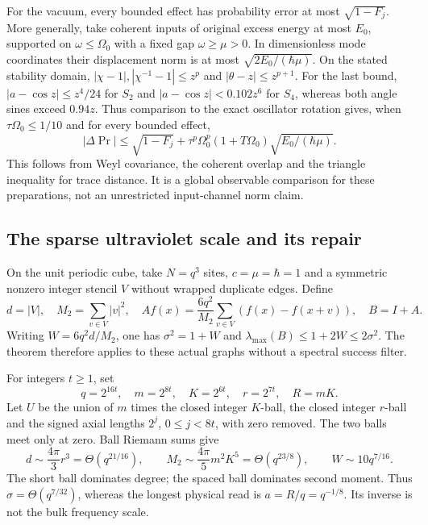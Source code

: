 For the vacuum, every bounded effect has probability error at most
$\sqrt{1-F_j}$. More generally, take coherent inputs of original excess
energy at most $E_0$, supported on $\omega\le\Omega_0$ with a fixed gap
$\omega\ge\mu>0$. In dimensionless mode coordinates their displacement
norm is at most $\sqrt{2E_0/(\hbar\mu)}$. On the stated stability domain,
$|\chi-1|,|\chi^{-1}-1|\le z^p$ and $|\theta-z|\le z^{p+1}$.
For the last bound, $|a-\cos z|\le z^4/24$ for $S_2$ and
$|a-\cos z|<0.102z^6$ for $S_4$, whereas both angle sines exceed $0.94z$.
Thus comparison to the exact oscillator rotation gives, when
$\tau\Omega_0\le1/10$ and for every bounded effect,
\[
 |\Delta\Pr|\le\sqrt{1-F_j}
  +\tau^p\Omega_0^p(1+T\Omega_0)\sqrt{E_0/(\hbar\mu)}.
\]
This follows from Weyl covariance, the coherent overlap and the triangle
inequality for trace distance. It is a global observable comparison for
these preparations, not an unrestricted input-channel norm claim.

\subsection{The sparse ultraviolet scale and its repair}

On the unit periodic cube, take $N=q^3$ sites, $c=\mu=\hbar=1$ and a
symmetric nonzero integer stencil $V$ without wrapped duplicate edges. Define
\[
 d=|V|,\quad M_2=\sum_{v\in V}|v|^2,\quad
 A f(x)=\frac{6q^2}{M_2}\sum_{v\in V}(f(x)-f(x+v)),\quad B=I+A.
\]
Writing $W=6q^2d/M_2$, one has $\sigma^2=1+W$ and
$\lambda_{\max}(B)\le1+2W\le2\sigma^2$. The theorem therefore applies
to these actual graphs without a spectral success filter.

For integers $t\ge1$, set
\[
 q=2^{16t},\quad m=2^{8t},\quad K=2^{6t},\quad r=2^{7t},\quad R=mK.
\]
Let $U$ be the union of $m$ times the closed integer $K$-ball, the closed
integer $r$-ball and the signed axial lengths $2^j$, $0\le j<8t$, with
zero removed. The two balls meet only at zero. Ball Riemann sums give
\[
 d\sim\frac{4\pi}{3}r^3=\Theta(q^{21/16}),\qquad
 M_2\sim\frac{4\pi}{5}m^2K^5=\Theta(q^{23/8}),\qquad
 W\sim10q^{7/16}.
\]
The short ball dominates degree; the spaced ball dominates second moment.
Thus $\sigma=\Theta(q^{7/32})$, whereas the longest physical read is
$a=R/q=q^{-1/8}$. Its inverse is not the bulk frequency scale.


